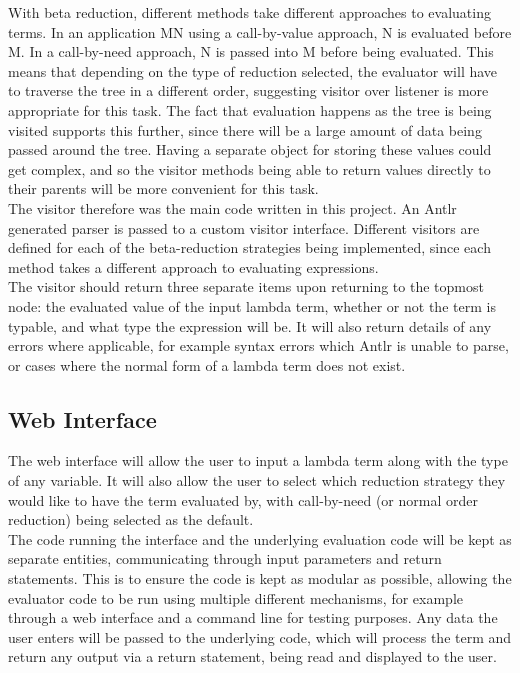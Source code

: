 \documentclass[a4paper,11pt]{report}
\begin{document}
With beta reduction, different methods take different approaches to evaluating terms. In an application MN using a call-by-value approach, N is evaluated before M. In a call-by-need approach, N is passed into M before being evaluated. This means that depending on the type of reduction selected, the evaluator will have to traverse the tree in a different order, suggesting visitor over listener is more appropriate for this task. The fact that evaluation happens as the tree is being visited supports this further, since there will be a large amount of data being passed around the tree. Having a separate object for storing these values could get complex, and so the visitor methods being able to return values directly to their parents will be more convenient for this task.\\

The visitor therefore was the main code written in this project. An Antlr generated parser is passed to a custom visitor interface. Different visitors are defined for each of the beta-reduction strategies being implemented, since each method takes a different approach to evaluating expressions.\\

The visitor should return three separate items upon returning to the topmost node: the evaluated value of the input lambda term, whether or not the term is typable, and what type the expression will be. It will also return details of any errors where applicable, for example syntax errors which Antlr is unable to parse, or cases where the normal form of a lambda term does not exist.

\subsection{Web Interface}

The web interface will allow the user to input a lambda term along with the type of any variable. It will also allow the user to select which reduction strategy they would like to have the term evaluated by, with call-by-need (or normal order reduction) being selected as the default.\\

The code running the interface and the underlying evaluation code will be kept as separate entities, communicating through input parameters and return statements. This is to ensure the code is kept as modular as possible, allowing the evaluator code to be run using multiple different mechanisms, for example through a web interface and a command line for testing purposes. Any data the user enters will be passed to the underlying code, which will process the term and return any output via a return statement, being read and displayed to the user.
\end{document}
